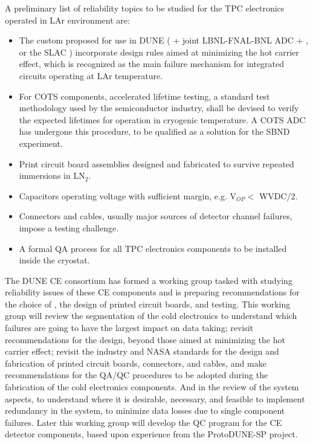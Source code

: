 A preliminary list of reliability topics to be studied for the TPC electronics operated in LAr environment are:
\begin{itemize}
	\item The custom  proposed for use in DUNE ( + joint LBNL-FNAL-BNL ADC +  , or the SLAC  ) incorporate design rules aimed at minimizing the hot carrier effect\cite{Li:2013ieee}\cite{Hoff:2015hax}, which is recognized as the main failure mechanism for integrated circuits operating at LAr temperature.
	\item For COTS components, accelerated lifetime testing, a standard test methodology used by the semiconductor industry, shall be devised to verify the expected lifetimes for operation in cryogenic temperature. A COTS ADC has undergone this procedure, to be qualified as a solution for the SBND experiment\cite{Chen:2018zic}.
	\item Print circuit board assemblies designed and fabricated to survive repeated immersions in LN$_2$.
	\item Capacitors operating voltage with sufficient margin, e.g. V$_{OP}<$ WVDC/2.
	\item Connectors and cables, usually major sources of detector channel failures, impose a testing challenge.
	\item A formal QA process for all TPC electronics components to be installed inside the cryostat.
\end{itemize}
The DUNE CE consortium has formed a working group tasked with studying reliability issues of these CE components and is preparing recommendations for the choice of , the design of printed circuit boards, and testing. This working group will review the segmentation of the cold electronics to understand which failures are going to have the largest impact on data taking; revisit recommendations for the  design, beyond those aimed at minimizing the hot carrier effect; revisit the industry and NASA standards for the design and fabrication of printed circuit boards, connectors, and cables, and make recommendations for the QA/QC procedures to be adopted during the fabrication of the cold electronics components. And in the review of the system aspects, to understand where it is desirable, necessary, and feasible to implement redundancy in the system, to minimize data losses due to single component failures. Later this working group will develop the QC program for the CE detector components, based upon experience from the ProtoDUNE-SP project.
